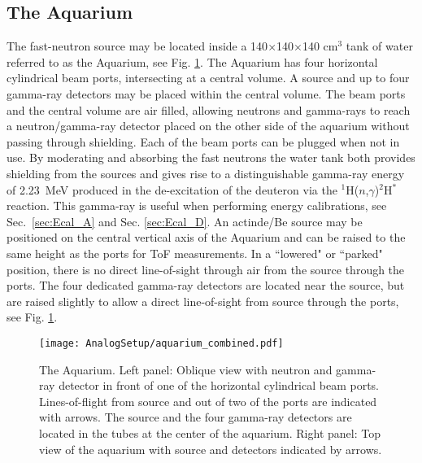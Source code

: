 \documentclass[main.tex]{subfiles}
\begin{document}
\subsection{The Aquarium}
The fast-neutron source may be located inside a 140$\times$140$\times$140 \si{\cm}${}^\text{3}$ tank of water referred to as the Aquarium, see Fig. \ref{fig:aquarium}. The Aquarium has four horizontal cylindrical beam ports, intersecting at a central volume. A source and up to four gamma-ray detectors may be placed within the central volume.  The beam ports and the central volume are air filled, allowing neutrons and gamma-rays to reach a neutron/gamma-ray detector placed on the other side of the aquarium without passing through shielding. Each of the beam ports can be plugged when not in use.
By moderating and absorbing the fast neutrons the water tank both provides shielding from the sources and gives rise to a distinguishable gamma-ray energy of \SI{2.23}{MeV} produced in the de-excitation of the deuteron via the $^{\text{1}}$H($n$,$\gamma$)$^{\text{2}}$H$^*$ reaction. This gamma-ray is useful when performing energy calibrations, see Sec.~\ref{sec:Ecal_A} and Sec. \ref{sec:Ecal_D}. 
An actinde/Be source may be positioned on the central vertical axis of the Aquarium and can be raised to the same height as the ports for ToF measurements. In a ``lowered" or ``parked" position, there is no direct line-of-sight through air from the source through the ports. The four dedicated gamma-ray detectors are located near the source, but are raised slightly to allow a direct line-of-sight from source through the ports, see Fig. \ref{fig:aquarium}.
\begin{figure}[ht]
	\center
    	\texttt{[image: AnalogSetup/aquarium\_combined.pdf]}
	\caption[The Aquarium]{The Aquarium. Left panel: Oblique view with neutron and gamma-ray detector in front of one of the horizontal cylindrical beam ports. Lines-of-flight from source and out of two of the ports are indicated with arrows. The source and the four gamma-ray detectors are located in the tubes at the center of the aquarium. Right panel: Top view of the aquarium with source and detectors indicated by arrows.}
	\label{fig:aquarium}
\end{figure}
\end{document}

